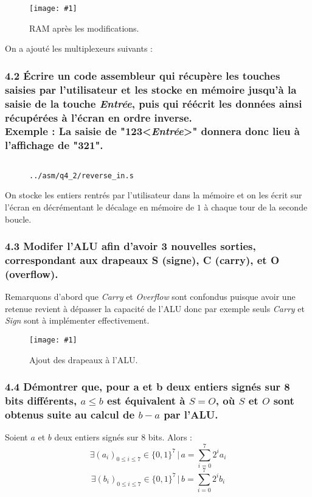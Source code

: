 \documentclass[twoside, 12pt, a4paper]{article}
\newcommand{\cf}[3]{
    \begin{figure}[!h]
        \centering
        \texttt{[image: \#1]}
    \caption{#3}\label{Fig:#1}
    \end{figure}
}
\newcommand{\hcf}[2]{\cf{#1}{.75}{#2}}
\newcommand{\qcf}[2]{\cf{#1}{.5}{#2}}
\newcommand{\fm}[2]{
\begin{figure}[!h]
    \centering
    \inputminted[]{asm}{#1}
    \caption{\texttt{#2}}
\end{figure}
}
\begin{document}
\clearpage

\hcf{ram.png}{RAM après les modifications.}

On a ajouté les multiplexeurs suivants :


\clearpage

        \subsubsection*{\textbf{4.2} Écrire un code assembleur qui récupère les touches saisies par l'utilisateur et les stocke en mémoire jusqu'à la saisie de la touche \textit{Entrée}, puis qui réécrit les données ainsi récupérées à l'écran en ordre inverse. \\
        \textbf{Exemple : } La saisie de "123<\textit{Entrée}>" donnera donc lieu à l'affichage de "321".}

\fm{../asm/q4_2/reverse_in.s}{../asm/q4\_2/reverse\_in.s}

On stocke les entiers rentrés par l'utilisateur dans la mémoire et on les écrit sur l'écran en décrémentant le décalage en mémoire de $1$ à chaque tour de la seconde boucle.

\clearpage
      
        \subsubsection*{\textbf{4.3} Modifer l'ALU afin d'avoir 3 nouvelles sorties, correspondant aux drapeaux S (signe), C (carry), et O (overflow).}

Remarquons d'abord que \textit{Carry} et \textit{Overflow} sont confondus puisque avoir une retenue revient à dépasser la capacité de l'ALU donc par exemple seuls \textit{Carry} et \textit{Sign} sont à implémenter effectivement.

\qcf{ALU_flags.png}{Ajout des drapeaux à l'ALU.}

\clearpage
        
        \subsubsection*{\textbf{4.4} Démontrer que, pour a et b deux entiers signés sur 8 bits différents, $a \leq b$ est équivalent à $S = O$, où $S$ et $O$ sont obtenus suite au calcul de $b-a$ par l'ALU.}
        Soient $a$ et $b$ deux entiers signés sur 8 bits.
        Alors :
        $$
        \exists (a_i)_{0\leq i \leq 7} \in \{0, 1\}^7 \, | \, a = \sum_{i=0}^7 2^i a_i
        $$
        $$
        \exists (b_i)_{0\leq i \leq 7} \in \{0, 1\}^7 \, | \, b = \sum_{i=0}^7 2^i b_i
        $$
\end{document}

